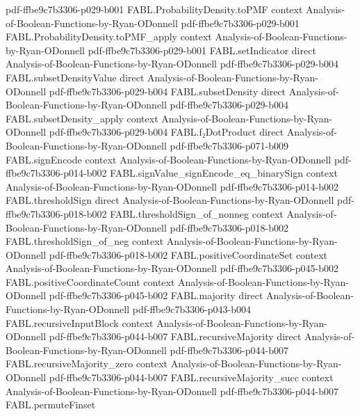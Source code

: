 \begin{theorem}
  {pdf-ffbe9c7b3306-p029-b001}
\proofstep
  {FABL.ProbabilityDensity.toPMF}
  {context}
  {Analysis-of-Boolean-Functions-by-Ryan-ODonnell}
  {pdf-ffbe9c7b3306-p029-b001}
\proofstep
  {FABL.ProbabilityDensity.toPMF_apply}
  {context}
  {Analysis-of-Boolean-Functions-by-Ryan-ODonnell}
  {pdf-ffbe9c7b3306-p029-b001}
\proofstep
  {FABL.setIndicator}
  {direct}
  {Analysis-of-Boolean-Functions-by-Ryan-ODonnell}
  {pdf-ffbe9c7b3306-p029-b004}
\proofstep
  {FABL.subsetDensityValue}
  {direct}
  {Analysis-of-Boolean-Functions-by-Ryan-ODonnell}
  {pdf-ffbe9c7b3306-p029-b004}
\proofstep
  {FABL.subsetDensity}
  {direct}
  {Analysis-of-Boolean-Functions-by-Ryan-ODonnell}
  {pdf-ffbe9c7b3306-p029-b004}
\proofstep
  {FABL.subsetDensity_apply}
  {context}
  {Analysis-of-Boolean-Functions-by-Ryan-ODonnell}
  {pdf-ffbe9c7b3306-p029-b004}
\proofstep
  {FABL.f₂DotProduct}
  {direct}
  {Analysis-of-Boolean-Functions-by-Ryan-ODonnell}
  {pdf-ffbe9c7b3306-p071-b009}
\proofstep
  {FABL.signEncode}
  {context}
  {Analysis-of-Boolean-Functions-by-Ryan-ODonnell}
  {pdf-ffbe9c7b3306-p014-b002}
\proofstep
  {FABL.signValue_signEncode_eq_binarySign}
  {context}
  {Analysis-of-Boolean-Functions-by-Ryan-ODonnell}
  {pdf-ffbe9c7b3306-p014-b002}
\proofstep
  {FABL.thresholdSign}
  {direct}
  {Analysis-of-Boolean-Functions-by-Ryan-ODonnell}
  {pdf-ffbe9c7b3306-p018-b002}
\proofstep
  {FABL.thresholdSign_of_nonneg}
  {context}
  {Analysis-of-Boolean-Functions-by-Ryan-ODonnell}
  {pdf-ffbe9c7b3306-p018-b002}
\proofstep
  {FABL.thresholdSign_of_neg}
  {context}
  {Analysis-of-Boolean-Functions-by-Ryan-ODonnell}
  {pdf-ffbe9c7b3306-p018-b002}
\proofstep
  {FABL.positiveCoordinateSet}
  {context}
  {Analysis-of-Boolean-Functions-by-Ryan-ODonnell}
  {pdf-ffbe9c7b3306-p045-b002}
\proofstep
  {FABL.positiveCoordinateCount}
  {context}
  {Analysis-of-Boolean-Functions-by-Ryan-ODonnell}
  {pdf-ffbe9c7b3306-p045-b002}
\proofstep
  {FABL.majority}
  {direct}
  {Analysis-of-Boolean-Functions-by-Ryan-ODonnell}
  {pdf-ffbe9c7b3306-p043-b004}
\proofstep
  {FABL.recursiveInputBlock}
  {context}
  {Analysis-of-Boolean-Functions-by-Ryan-ODonnell}
  {pdf-ffbe9c7b3306-p044-b007}
\proofstep
  {FABL.recursiveMajority}
  {direct}
  {Analysis-of-Boolean-Functions-by-Ryan-ODonnell}
  {pdf-ffbe9c7b3306-p044-b007}
\proofstep
  {FABL.recursiveMajority_zero}
  {context}
  {Analysis-of-Boolean-Functions-by-Ryan-ODonnell}
  {pdf-ffbe9c7b3306-p044-b007}
\proofstep
  {FABL.recursiveMajority_succ}
  {context}
  {Analysis-of-Boolean-Functions-by-Ryan-ODonnell}
  {pdf-ffbe9c7b3306-p044-b007}
\proofstep
  {FABL.permuteFinset}

\end{theorem}
